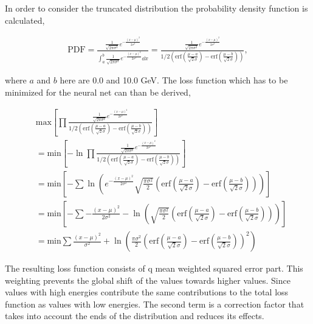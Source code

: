 \documentclass[12pt, a4paper]{thesis}
\begin{document}
In order to consider the truncated distribution the probability
density function is calculated,

\begin{align}
\text{PDF} = \frac{\frac{1}{\sqrt{2\pi \sigma^2}} e^{-\frac{(x-\mu)^2}{2 \sigma^2}}}{\int^b_a \frac{1}{\sqrt{2\pi \sigma^2}} e^{-\frac{(x-\mu)^2}{2 \sigma^2}} \dd x} = \frac{\frac{1}{\sqrt{2\pi \sigma^2}} e^{-\frac{(x-\mu)^2}{2 \sigma^2}}}{1/2\left(\text{erf}\left(\frac{\mu-a}{\sqrt{2}\sigma}\right) - \text{erf}\left(\frac{\mu-b}{\sqrt{2}\sigma}\right)\right)},
\end{align}

where \(a\) and \(b\) here are 0.0 and 10.0 GeV. The loss function
which has to be minimized for the neural net can than be derived,

\begin{align}
&\text{max}\left[ \prod \frac{\frac{1}{\sqrt{2\pi \sigma^2}} e^{-\frac{(x-\mu)^2}{2 \sigma^2}}}{1/2\left(\text{erf}\left(\frac{\mu-a}{\sqrt{2}\sigma}\right) - \text{erf}\left(\frac{\mu-b}{\sqrt{2}\sigma}\right)\right)} \right]\\
&=\text{min}\left[ -\ln \prod \frac{\frac{1}{\sqrt{2\pi \sigma^2}} e^{-\frac{(x-\mu)^2}{2 \sigma^2}}}{1/2\left(\text{erf}\left(\frac{\mu-a}{\sqrt{2}\sigma}\right) - \text{erf}\left(\frac{\mu-b}{\sqrt{2}\sigma}\right)\right)}\right] \\
&=\text{min}\left[ -\sum \ln(e^{-\frac{(x-\mu)^2}{2 \sigma^2}}{\sqrt{\frac{\pi \sigma^2}{2}}\left(\text{erf}\left(\frac{\mu-a}{\sqrt{2}\sigma}\right) - \text{erf}\left(\frac{\mu-b}{\sqrt{2}\sigma}\right)\right)})\right] \\
&=\text{min}\left[ -\sum -\frac{(x-\mu)^2}{2 \sigma^2}-\ln(\sqrt{\frac{\pi \sigma^2}{2}}\left(\text{erf}\left(\frac{\mu-a}{\sqrt{2}\sigma}\right) - \text{erf}\left(\frac{\mu-b}{\sqrt{2}\sigma}\right)\right))\right] \\
&=\text{min}  \sum \frac{(x-\mu)^2}{\sigma^2} + \ln(\frac{\pi \sigma^2}{2}\left(\text{erf}\left(\frac{\mu-a}{\sqrt{2}\sigma}\right) - \text{erf}\left(\frac{\mu-b}{\sqrt{2}\sigma}\right)\right)^2) \label{likelihood-loss}
\end{align}

The resulting loss function consists of q mean weighted squared error
part. This weighting prevents the global shift of the values towards
higher values. Since values with high energies contribute the same
contributions to the total loss function as values with low
energies. The second term is a correction factor that takes into
account the ends of the distribution and reduces its effects.
\end{document}

